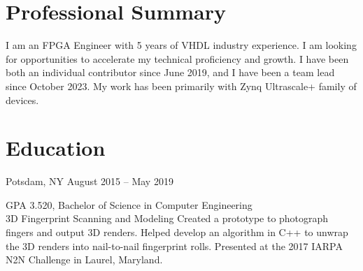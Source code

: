 \documentclass[10pt,final,sans]{resume}
\begin{document}
\setlength\headheight{28pt} %

\section{Professional Summary}
\begin{adjustwidth}{.3cm}{}
  \raggedright{I am an FPGA Engineer with 5 years of VHDL industry experience. I am looking for opportunities to accelerate my technical proficiency and growth. I have been both an individual contributor since June 2019, and I have been a team lead since October 2023. My work has been primarily with Zynq Ultrascale+ family of devices.}
\end{adjustwidth}

\vfill

\section{Education}
 { Potsdam, NY } { August 2015 -- May 2019 }
\begin{adjustwidth}{.3cm}{}
  GPA 3.520, Bachelor of Science in Computer Engineering\\
   { 3D Fingerprint Scanning and Modeling } { }
  Created a prototype to photograph fingers and output 3D renders. Helped develop an algorithm in C++ to unwrap the 3D renders into nail-to-nail fingerprint rolls. Presented at the 2017 IARPA N2N Challenge in Laurel, Maryland.
\end{adjustwidth}
\end{document}
